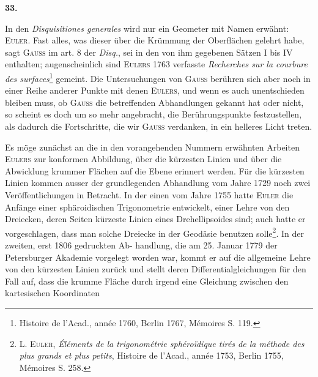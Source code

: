 \clearpage\begingroup{}
\renewcommand{\thefootnote}{\arabic{footnote})}\setcounter{footnote}{1}
\begin{center}
\textbf{33.}\par\smallskip
{}
\end{center}
\noindent\hspace*{\parindent}In den \textit{Disquisitiones generales} wird nur ein Geometer mit Namen erwähnt:
\textsc{Euler}. Fast alles, was dieser über die Krümmung der Oberflächen gelehrt
habe, sagt \textsc{Gauss} im art. 8 der \textit{Disq.}, sei in den von ihm gegebenen Sätzen
I bis IV enthalten; augenscheinlich sind \textsc{Eulers} 1763 verfasste \textit{Recherches
sur la courbure des surfaces}\footnote{Histoire de l’Acad., année 1760, Berlin 1767, Mémoires S. 119.} gemeint. Die Untersuchungen von \textsc{Gauss} berühren
sich aber noch in einer Reihe anderer Punkte mit denen \textsc{Eulers}, und
wenn es auch unentschieden bleiben muss, ob \textsc{Gauss} die betreffenden Abhandlungen
gekannt hat oder nicht, so scheint es doch um so mehr angebracht,
die Berührungspunkte festzustellen, als dadurch die Fortschritte, die wir \textsc{Gauss}
verdanken, in ein helleres Licht treten.
\par
Es möge zunächst an die in den vorangehenden Nummern erwähnten Arbeiten
\textsc{Eulers} zur konformen Abbildung, über die kürzesten Linien und über
die Abwicklung krummer Flächen auf die Ebene erinnert werden. Für die
kürzesten Linien kommen ausser der grundlegenden Abhandlung vom Jahre
1729 noch zwei Veröffentlichungen in Betracht. In der einen vom Jahre
1755 hatte \textsc{Euler} die Anfänge einer sphäroidischen Trigonometrie entwickelt,
einer Lehre von den Dreiecken, deren Seiten kürzeste Linien eines Drehellipsoides
sind; auch hatte er vorgeschlagen, dass man solche Dreiecke in
der Geodäsie benutzen solle\footnote{\textsc{L. Euler}, \textit{Éléments de la trigonométrie sphéroïdique tirés de la méthode des plus grands et plus petits}, Histoire de l’Acad., année 1753, Berlin 1755, Mémoires S. 258.}. In der zweiten, erst 1806 gedruckten Ab-
\clearpage{}\setcounter{footnote}{0}
\noindent handlung, die am 25. Januar 1779 der Petersburger Akademie vorgelegt worden
war, kommt er auf die allgemeine Lehre von den kürzesten Linien zurück
und stellt deren Differentialgleichungen für den Fall auf, dass die krumme
Fläche durch irgend eine Gleichung zwischen den kartesischen Koordinaten
